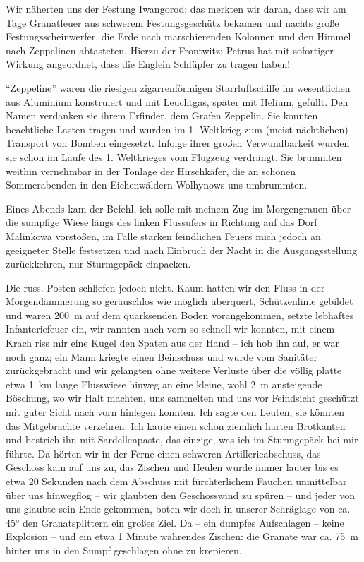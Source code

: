 \documentclass[a5paper,pagesize,10pt,twoside=true]{scrbook}
\begin{document}
Wir näherten uns der Festung Iwangorod; das merkten wir daran, dass wir am Tage Granatfeuer aus schwerem Festungsgeschütz bekamen und nachts große Festungsscheinwerfer, die Erde nach marschierenden Kolonnen und den Himmel nach Zeppelinen abtasteten. Hierzu der Frontwitz: Petrus hat mit sofortiger Wirkung angeordnet, dass die Englein Schlüpfer zu tragen haben!

\enquote{Zeppeline} waren die riesigen zigarrenförmigen Starrluftschiffe im wesentlichen aus Aluminium konstruiert und mit Leuchtgas, später mit Helium, gefüllt. Den Namen verdanken sie ihrem Erfinder, dem Grafen Zeppelin. Sie konnten beachtliche Lasten tragen und wurden im 1. Weltkrieg zum (meist nächtlichen) Transport von Bomben eingesetzt. Infolge ihrer großen Verwundbarkeit wurden sie schon im Laufe des 1. Weltkrieges vom Flugzeug verdrängt. Sie brummten weithin vernehmbar in der Tonlage der Hirschkäfer, die an schönen Sommerabenden in den Eichenwäldern Wolhynows uns umbrummten.

Eines Abends kam der Befehl, ich solle mit meinem Zug im Morgengrauen über die sumpfige Wiese längs des linken Flussufers in Richtung auf das Dorf Malinkowa vorstoßen, im Falle starken feindlichen Feuers mich jedoch an geeigneter Stelle festsetzen und nach Einbruch der Nacht in die Ausgangsstellung zurückkehren, nur Sturmgepäck einpacken.

Die russ. Posten schliefen jedoch nicht. Kaum hatten wir den Fluss in der Morgendämmerung so geräuschlos wie möglich überquert, Schützenlinie gebildet und waren 200~m auf dem quarksenden Boden vorangekommen, setzte lebhaftes Infanteriefeuer ein, wir rannten nach vorn so schnell wir konnten, mit einem Krach riss mir eine Kugel den Spaten aus der Hand -- ich hob ihn auf, er war noch ganz; ein Mann kriegte einen Beinschuss und wurde vom Sanitäter zurückgebracht und wir gelangten ohne weitere Verluste über die völlig platte etwa 1~km lange Flusswiese hinweg an eine kleine, wohl 2~m ansteigende Böschung, wo wir Halt machten, uns sammelten und uns vor Feindsicht geschützt mit guter Sicht nach vorn hinlegen konnten. Ich sagte den Leuten, sie könnten das Mitgebrachte verzehren. Ich kaute einen schon ziemlich harten Brotkanten und bestrich ihn mit Sardellenpaste, das einzige, was ich im Sturmgepäck bei mir führte. Da hörten wir in der Ferne einen schweren Artillerieabschuss, das Geschoss kam auf uns zu, das Zischen und Heulen wurde immer lauter bis es etwa 20 Sekunden nach dem Abschuss mit fürchterlichem Fauchen unmittelbar über uns hinwegflog -- wir glaubten den Geschosswind zu spüren -- und jeder von uns glaubte sein Ende gekommen, boten wir doch in unserer Schräglage von ca. 45° den Granatsplittern ein großes Ziel. Da -- ein dumpfes Aufschlagen -- keine Explosion -- und ein etwa 1 Minute währendes Zischen: die Granate war ca. 75~m hinter uns in den Sumpf geschlagen ohne zu krepieren.
\end{document}
